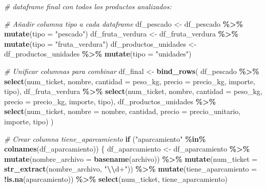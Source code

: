 \documentclass[,,,oneauthor,pdftex]{Definitions/mdpi}
\newenvironment{Shaded}{\begin{snugshade}}{\end{snugshade}}
\newcommand{\AttributeTok}[1]{\textcolor[rgb]{0.13,0.29,0.53}{#1}}
\newcommand{\CommentTok}[1]{\textcolor[rgb]{0.56,0.35,0.01}{\textit{#1}}}
\newcommand{\ControlFlowTok}[1]{\textcolor[rgb]{0.13,0.29,0.53}{\textbf{#1}}}
\newcommand{\FunctionTok}[1]{\textcolor[rgb]{0.13,0.29,0.53}{\textbf{#1}}}
\newcommand{\NormalTok}[1]{#1}
\newcommand{\OtherTok}[1]{\textcolor[rgb]{0.56,0.35,0.01}{#1}}
\newcommand{\SpecialCharTok}[1]{\textcolor[rgb]{0.81,0.36,0.00}{\textbf{#1}}}
\newcommand{\StringTok}[1]{\textcolor[rgb]{0.31,0.60,0.02}{#1}}
\begin{document}
\begin{Shaded}
\begin{Highlighting}[]
\CommentTok{\# dataframe final con todos los productos analizados:}

\CommentTok{\# Añadir columna \textquotesingle{}tipo\textquotesingle{} a cada dataframe}
\NormalTok{df\_pescado }\OtherTok{\textless{}{-}}\NormalTok{ df\_pescado }\SpecialCharTok{\%\textgreater{}\%} \FunctionTok{mutate}\NormalTok{(}\AttributeTok{tipo =} \StringTok{"pescado"}\NormalTok{)}
\NormalTok{df\_fruta\_verdura }\OtherTok{\textless{}{-}}\NormalTok{ df\_fruta\_verdura }\SpecialCharTok{\%\textgreater{}\%} \FunctionTok{mutate}\NormalTok{(}\AttributeTok{tipo =} \StringTok{"fruta\_verdura"}\NormalTok{)}
\NormalTok{df\_productos\_unidades }\OtherTok{\textless{}{-}}\NormalTok{ df\_productos\_unidades }\SpecialCharTok{\%\textgreater{}\%} \FunctionTok{mutate}\NormalTok{(}\AttributeTok{tipo =} \StringTok{"unidades"}\NormalTok{)}

\CommentTok{\# Unificar columnas para combinar}
\NormalTok{df\_final }\OtherTok{\textless{}{-}} \FunctionTok{bind\_rows}\NormalTok{(}
\NormalTok{  df\_pescado }\SpecialCharTok{\%\textgreater{}\%} \FunctionTok{select}\NormalTok{(num\_ticket, nombre, }\AttributeTok{cantidad =}\NormalTok{ peso\_kg, }\AttributeTok{precio =}\NormalTok{ precio\_kg, importe, tipo),}
\NormalTok{  df\_fruta\_verdura }\SpecialCharTok{\%\textgreater{}\%} \FunctionTok{select}\NormalTok{(num\_ticket, nombre, }\AttributeTok{cantidad =}\NormalTok{ peso\_kg, }\AttributeTok{precio =}\NormalTok{ precio\_kg, importe, tipo),}
\NormalTok{  df\_productos\_unidades }\SpecialCharTok{\%\textgreater{}\%} \FunctionTok{select}\NormalTok{(num\_ticket, }\AttributeTok{nombre =}\NormalTok{ nombre, cantidad, }\AttributeTok{precio =}\NormalTok{ precio\_unitario, importe, tipo)}
\NormalTok{)}

\CommentTok{\# Crear columna tiene\_aparcamiento }
\ControlFlowTok{if}\NormalTok{ (}\StringTok{"aparcamiento"} \SpecialCharTok{\%in\%} \FunctionTok{colnames}\NormalTok{(df\_aparcamiento)) \{}
\NormalTok{  df\_aparcamiento }\OtherTok{\textless{}{-}}\NormalTok{ df\_aparcamiento }\SpecialCharTok{\%\textgreater{}\%}
    \FunctionTok{mutate}\NormalTok{(}\AttributeTok{nombre\_archivo =} \FunctionTok{basename}\NormalTok{(archivo)) }\SpecialCharTok{\%\textgreater{}\%}
    \FunctionTok{mutate}\NormalTok{(}\AttributeTok{num\_ticket =} \FunctionTok{str\_extract}\NormalTok{(nombre\_archivo, }\StringTok{"}\SpecialCharTok{\textbackslash{}\textbackslash{}}\StringTok{d+"}\NormalTok{)) }\SpecialCharTok{\%\textgreater{}\%}
    \FunctionTok{mutate}\NormalTok{(}\AttributeTok{tiene\_aparcamiento =} \SpecialCharTok{!}\FunctionTok{is.na}\NormalTok{(aparcamiento)) }\SpecialCharTok{\%\textgreater{}\%}
    \FunctionTok{select}\NormalTok{(num\_ticket, tiene\_aparcamiento)}


\end{Highlighting}
\end{Shaded}
\end{document}

